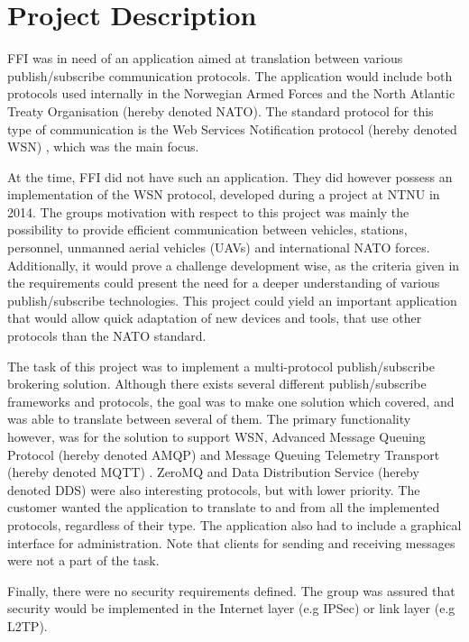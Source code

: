 \section{Project Description}
\label{sec:introduction-project_description}

FFI was in need of an application aimed at translation between various publish/subscribe communication protocols. The application would include both protocols used internally in the Norwegian Armed Forces and the North Atlantic Treaty Organisation (hereby denoted NATO). The standard protocol for this type of communication is the Web Services Notification protocol (hereby denoted WSN) \cite{wsn-complete}, which was the main focus.

At the time, FFI did not have such an application. They did however possess an implementation of the WSN protocol, developed during a project at NTNU in 2014. The groups motivation with respect to this project was mainly the possibility to provide efficient communication between vehicles, stations, personnel, unmanned aerial vehicles (UAVs) and international NATO forces. Additionally, it would prove a challenge development wise, as the criteria given in the requirements could present the need for a deeper understanding of various publish/subscribe technologies. This project could yield an important application that would allow quick adaptation of new devices and tools, that use other protocols than the NATO standard.

The task of this project was to implement a multi-protocol publish/subscribe brokering solution. Although there exists several different publish/subscribe frameworks and protocols, the goal was to make one solution which covered, and was able to translate between several of them. The primary functionality however, was for the solution to support WSN, Advanced Message Queuing Protocol (hereby denoted AMQP) \cite{amqp} and Message Queuing Telemetry Transport (hereby denoted MQTT) \cite{mqtt}. ZeroMQ \cite{zero-mq} and Data Distribution Service (hereby denoted DDS) \cite{dds} were also interesting protocols, but with lower priority. The customer wanted the application to translate to and from all the implemented protocols, regardless of their type. The application also had to include a graphical interface for administration. Note that clients for sending and receiving messages were not a part of the task.

Finally, there were no security requirements defined. The group was assured that security would be implemented in the Internet layer (e.g IPSec) or link layer (e.g L2TP).


